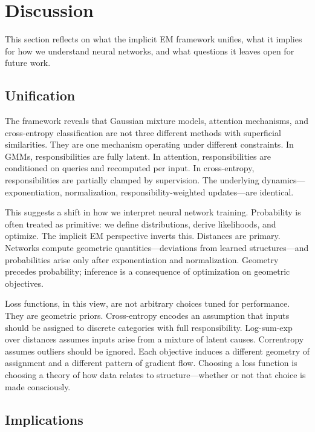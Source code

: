 \section{Discussion}

This section reflects on what the implicit EM framework unifies, what it implies for how we understand neural networks, and what questions it leaves open for future work.

\subsection{Unification}

The framework reveals that Gaussian mixture models, attention mechanisms, and cross-entropy classification are not three different methods with superficial similarities. They are one mechanism operating under different constraints. In GMMs, responsibilities are fully latent. In attention, responsibilities are conditioned on queries and recomputed per input. In cross-entropy, responsibilities are partially clamped by supervision. The underlying dynamics---exponentiation, normalization, responsibility-weighted updates---are identical.

This suggests a shift in how we interpret neural network training. Probability is often treated as primitive: we define distributions, derive likelihoods, and optimize. The implicit EM perspective inverts this. Distances are primary. Networks compute geometric quantities---deviations from learned structures---and probabilities arise only after exponentiation and normalization. Geometry precedes probability; inference is a consequence of optimization on geometric objectives.

Loss functions, in this view, are not arbitrary choices tuned for performance. They are geometric priors. Cross-entropy encodes an assumption that inputs should be assigned to discrete categories with full responsibility. Log-sum-exp over distances assumes inputs arise from a mixture of latent causes. Correntropy assumes outliers should be ignored. Each objective induces a different geometry of assignment and a different pattern of gradient flow. Choosing a loss function is choosing a theory of how data relates to structure---whether or not that choice is made consciously.

\subsection{Implications}

